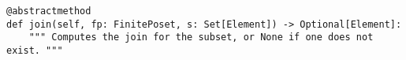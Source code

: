 \begin{verbatim}
@abstractmethod
def join(self, fp: FinitePoset, s: Set[Element]) -> Optional[Element]:
    """ Computes the join for the subset, or None if one does not exist. """
\end{verbatim}
